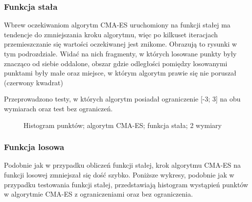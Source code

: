 \documentclass{mini}
\begin{document}
\subsubsection*{Funkcja stała}
Wbrew oczekiwaniom algorytm CMA-ES uruchomiony na funkcji stałej ma tendencje do zmniejszania kroku algorytmu, więc po kilkuset iteracjach przemieszczanie się wartości oczekiwanej jest znikome. Obrazują to rysunki w tym podrozdziale. Widać na nich fragmenty, w których losowane punkty były znacząco od siebie oddalone, obszar gdzie odległości pomiędzy losowanymi punktami były małe oraz miejsce, w którym algorytm prawie się nie poruszał (czerwony kwadrat)

Przeprowadzono testy, w których algorytm posiadał ograniczenie [-3; 3] na obu wymiarach oraz test bez ograniczeń.

\begin{figure}[H]
\centering
{}
\quad
{}
\caption{Histogram punktów; algorytm CMA-ES; funkcja stała; 2 wymiary}
\end{figure}

\subsubsection*{Funkcja losowa}
Podobnie jak w przypadku obliczeń funkcji stałej, krok algorytmu CMA-ES na funkcji losowej zmniejszał się dość szybko. Poniższe wykresy, podobnie jak w przypadku testowania funkcji stałej, przedstawiają histogram wystąpień punktów w algorytmie CMA-ES z ograniczeniami oraz bez ograniczenia.
\end{document}
